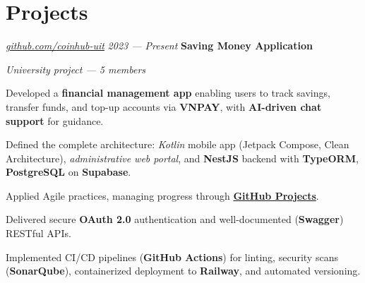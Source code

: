 \section{Projects}

\begin{twocolentry}{
		\textit{\href{https://github.com/coinhub-uit}{github.com/coinhub-uit}}
		\textit{2023 --- Present}
	}
	\textbf{Saving Money Application}

	\textit{University project — 5 members}
\end{twocolentry}

\begin{onecolentry}
	\begin{highlights}
		\item Developed a \textbf{financial management app} enabling users to track savings, transfer funds, and
		top-up accounts via \textbf{VNPAY}, with \textbf{AI-driven chat support} for guidance.
		\item Defined the complete architecture: \textit{Kotlin} mobile app (Jetpack Compose, Clean Architecture),
		\textit{administrative web portal}, and \textbf{NestJS} backend with \textbf{TypeORM},
		\textbf{PostgreSQL} on \textbf{Supabase}.
		\item Applied Agile practices, managing progress through
		\textbf{\href{https://github.com/orgs/coinhub-uit/projects/1}{GitHub Projects}}.
		\item Delivered secure \textbf{OAuth 2.0} authentication and well-documented (\textbf{Swagger}) RESTful APIs.
		\item Implemented CI/CD pipelines (\textbf{GitHub Actions}) for linting, security scans
		(\textbf{SonarQube}), containerized deployment to \textbf{Railway}, and automated versioning.
	\end{highlights}
\end{onecolentry}

